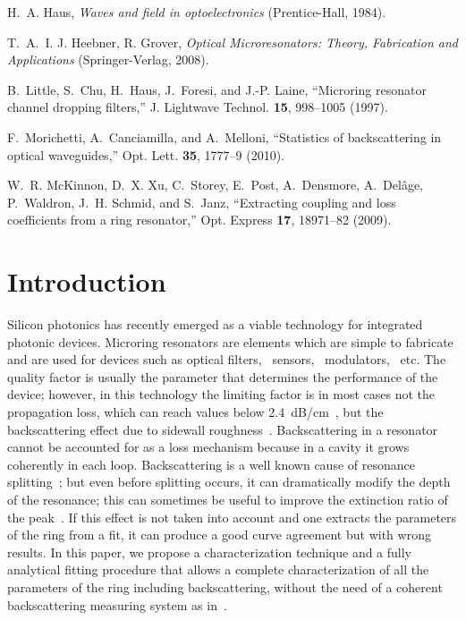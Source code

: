 \documentclass[10pt,letterpaper]{article}
\begin{document}
\begin{thebibliography}{10}
H.~A. Haus, \emph{{Waves and field in optoelectronics}} (Prentice-Hall, 1984).

T.~A.~I. {J. Heebner, R. Grover}, \emph{{Optical Microresonators: Theory,
  Fabrication and Applications}} (Springer-Verlag, 2008).

B.~Little, S.~Chu, H.~Haus, J.~Foresi, and J.-P. Laine, \enquote{{Microring
  resonator channel dropping filters},} J. Lightwave Technol.
  \textbf{15}, 998--1005 (1997).

F.~Morichetti, A.~Canciamilla, and A.~Melloni, \enquote{{Statistics of
  backscattering in optical waveguides},} Opt. Lett. \textbf{35}, 1777--9
  (2010).

W.~R. McKinnon, D.~X. Xu, C.~Storey, E.~Post, A.~Densmore, A.~Del\^{a}ge,
  P.~Waldron, J.~H. Schmid, and S.~Janz, \enquote{{Extracting coupling and loss
  coefficients from a ring resonator},} Opt. Express \textbf{17}, 18971--82
  (2009).

\end{thebibliography}
\section{Introduction}

Silicon photonics has recently emerged as a viable technology for integrated photonic devices. Microring resonators are elements which are simple to fabricate and are used for devices such as optical filters,~\cite{Little1998} sensors,~\cite{DeVos2007} modulators,~\cite{So2004} etc. The quality factor is usually the parameter that determines the performance of the device; however, in this technology the limiting factor is in most cases not the propagation loss, which can reach values below 2.4~dB/cm~\cite{Dumon2004}, but the backscattering effect due to sidewall roughness~\cite{Morichetti2010a}. Backscattering in a resonator cannot be accounted for as a loss mechanism because in a cavity it grows coherently in each loop. Backscattering is a well known cause of resonance splitting~\cite{Little1997a,Kippenberg2002}; but even before splitting occurs, it can dramatically modify the depth of the resonance; this can sometimes be useful to improve the extinction ratio of the peak~\cite{Zhang2008}. If this effect is not taken into account and one extracts the parameters of the ring from a fit, it can produce a good curve agreement but with wrong results.  In this paper, we propose a characterization technique and a fully analytical fitting procedure that allows a complete characterization of all the parameters of the ring including backscattering, without the need of a coherent backscattering measuring system as in~\cite{Morichetti2010a,Morichetti2010b}.
\end{document}
